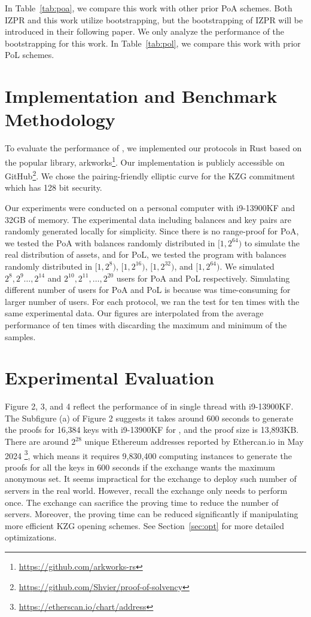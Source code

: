 

In Table~\ref{tab:poa}, we compare this work with other prior PoA schemes. Both IZPR and this work utilize bootstrapping, but the bootstrapping of IZPR will be introduced in their following paper. We only analyze the performance of the bootstrapping for this work. In Table~\ref{tab:pol}, we compare this work with prior PoL schemes.

\section{Implementation and Benchmark Methodology}



To evaluate the performance of \Sys, we implemented our protocols in Rust based on the popular library, arkworks\footnote{\url{https://github.com/arkworks-rs}}. Our implementation is publicly accessible on GitHub\footnote{\url{https://github.com/Shvier/proof-of-solvency}}. We chose the pairing-friendly elliptic curve \bls for the KZG commitment which has 128 bit security.

Our experiments were conducted on a personal computer with i9-13900KF and 32GB of memory. The experimental data including balances and \secp key pairs are randomly generated locally for simplicity. Since there is no range-proof for PoA, we tested the PoA with balances randomly distributed in $[1,2^{64})$ to simulate the real distribution of assets, and for PoL, we tested the program with balances randomly distributed in $[1,2^8)$, $[1,2^{16})$, $[1,2^{32})$, and $[1,2^{64})$. We simulated $2^8,2^9\dots,2^{14}$ and $2^{10},2^{11},\dots,2^{20}$ users for PoA and PoL respectively. Simulating different number of users for PoA and PoL is because \bootstrap was time-consuming for larger number of users. For each protocol, we ran the test for ten times with the same experimental data. Our figures are interpolated from the average performance of ten times with discarding the maximum and minimum of the samples.

\section{Experimental Evaluation}
Figure 2, 3, and 4 reflect the performance of \Sys in single thread with i9-13900KF. The Subfigure (a) of Figure 2 suggests it takes around 600 seconds to generate the proofs for 16,384 keys with i9-13900KF for \bootstrap, and the proof size is 13,893KB. There are around $2^{28}$ unique Ethereum addresses reported by Ethercan.io in May 2024 \footnote{\url{https://etherscan.io/chart/address}}, which means it requires 9,830,400 computing instances to generate the proofs for all the keys in 600 seconds if the exchange wants the maximum anonymous set. It seems impractical for the exchange to deploy such number of servers in the real world. However, recall the exchange only needs to perform \bootstrap once. The exchange can sacrifice the proving time to reduce the number of servers. Moreover, the proving time can be reduced significantly if manipulating more efficient KZG opening schemes. See Section~\ref{sec:opt} for more detailed optimizations. 

